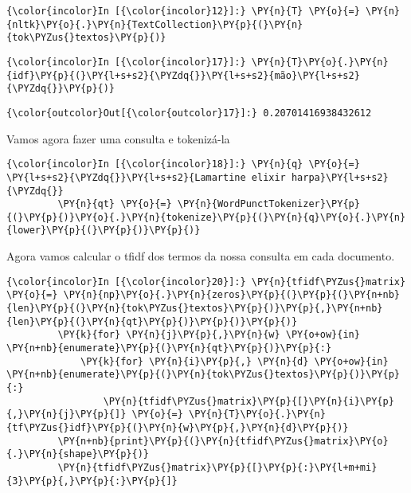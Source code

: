     \begin{Verbatim}[commandchars=\\\{\}]
{\color{incolor}In [{\color{incolor}12}]:} \PY{n}{T} \PY{o}{=} \PY{n}{nltk}\PY{o}{.}\PY{n}{TextCollection}\PY{p}{(}\PY{n}{tok\PYZus{}textos}\PY{p}{)}
\end{Verbatim}

    \begin{Verbatim}[commandchars=\\\{\}]
{\color{incolor}In [{\color{incolor}17}]:} \PY{n}{T}\PY{o}{.}\PY{n}{idf}\PY{p}{(}\PY{l+s+s2}{\PYZdq{}}\PY{l+s+s2}{mão}\PY{l+s+s2}{\PYZdq{}}\PY{p}{)}
\end{Verbatim}

            \begin{Verbatim}[commandchars=\\\{\}]
{\color{outcolor}Out[{\color{outcolor}17}]:} 0.20701416938432612
\end{Verbatim}
        
    Vamos agora fazer uma consulta e tokenizá-la

    \begin{Verbatim}[commandchars=\\\{\}]
{\color{incolor}In [{\color{incolor}18}]:} \PY{n}{q} \PY{o}{=} \PY{l+s+s2}{\PYZdq{}}\PY{l+s+s2}{Lamartine elixir harpa}\PY{l+s+s2}{\PYZdq{}}
         \PY{n}{qt} \PY{o}{=} \PY{n}{WordPunctTokenizer}\PY{p}{(}\PY{p}{)}\PY{o}{.}\PY{n}{tokenize}\PY{p}{(}\PY{n}{q}\PY{o}{.}\PY{n}{lower}\PY{p}{(}\PY{p}{)}\PY{p}{)}
\end{Verbatim}

    Agora vamos calcular o tfidf dos termos da nossa consulta em cada
documento.

    \begin{Verbatim}[commandchars=\\\{\}]
{\color{incolor}In [{\color{incolor}20}]:} \PY{n}{tfidf\PYZus{}matrix} \PY{o}{=} \PY{n}{np}\PY{o}{.}\PY{n}{zeros}\PY{p}{(}\PY{p}{(}\PY{n+nb}{len}\PY{p}{(}\PY{n}{tok\PYZus{}textos}\PY{p}{)}\PY{p}{,}\PY{n+nb}{len}\PY{p}{(}\PY{n}{qt}\PY{p}{)}\PY{p}{)}\PY{p}{)}
         \PY{k}{for} \PY{n}{j}\PY{p}{,}\PY{n}{w} \PY{o+ow}{in} \PY{n+nb}{enumerate}\PY{p}{(}\PY{n}{qt}\PY{p}{)}\PY{p}{:}
             \PY{k}{for} \PY{n}{i}\PY{p}{,} \PY{n}{d} \PY{o+ow}{in} \PY{n+nb}{enumerate}\PY{p}{(}\PY{n}{tok\PYZus{}textos}\PY{p}{)}\PY{p}{:}
                 \PY{n}{tfidf\PYZus{}matrix}\PY{p}{[}\PY{n}{i}\PY{p}{,}\PY{n}{j}\PY{p}{]} \PY{o}{=} \PY{n}{T}\PY{o}{.}\PY{n}{tf\PYZus{}idf}\PY{p}{(}\PY{n}{w}\PY{p}{,}\PY{n}{d}\PY{p}{)}
         \PY{n+nb}{print}\PY{p}{(}\PY{n}{tfidf\PYZus{}matrix}\PY{o}{.}\PY{n}{shape}\PY{p}{)}
         \PY{n}{tfidf\PYZus{}matrix}\PY{p}{[}\PY{p}{:}\PY{l+m+mi}{3}\PY{p}{,}\PY{p}{:}\PY{p}{]}
\end{Verbatim}

